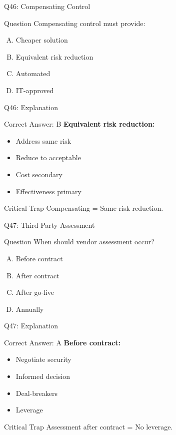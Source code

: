 \documentclass{beamer}
\begin{document}
			\begin{frame}{Q46: Compensating Control}
				\begin{block}{Question}
					Compensating control must provide:
				\end{block}
				\begin{enumerate}[(A)]
					\item Cheaper solution
					\item Equivalent risk reduction
					\item Automated
					\item IT-approved
				\end{enumerate}
			\end{frame}
			
			\begin{frame}{Q46: Explanation}
				\begin{block}{Correct Answer: B}
					\textbf{Equivalent risk reduction:}
					\begin{itemize}
						\item Address same risk
						\item Reduce to acceptable
						\item Cost secondary
						\item Effectiveness primary
					\end{itemize}
				\end{block}
				\begin{alertblock}{Critical Trap}
					Compensating = Same risk reduction.
				\end{alertblock}
			\end{frame}
			
			\begin{frame}{Q47: Third-Party Assessment}
				\begin{block}{Question}
					When should vendor assessment occur?
				\end{block}
				\begin{enumerate}[(A)]
					\item Before contract
					\item After contract
					\item After go-live
					\item Annually
				\end{enumerate}
			\end{frame}
			
			\begin{frame}{Q47: Explanation}
				\begin{block}{Correct Answer: A}
					\textbf{Before contract:}
					\begin{itemize}
						\item Negotiate security
						\item Informed decision
						\item Deal-breakers
						\item Leverage
					\end{itemize}
				\end{block}
				\begin{alertblock}{Critical Trap}
					Assessment after contract = No leverage.
				\end{alertblock}
			\end{frame}
			
\end{document}
